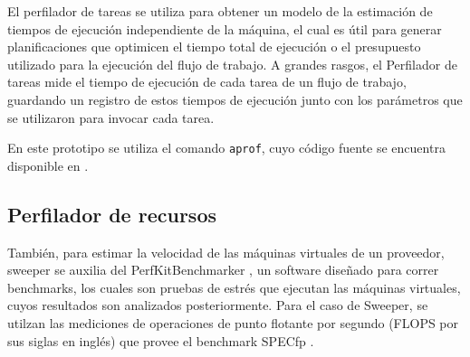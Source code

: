 El perfilador de tareas se utiliza para obtener un modelo de la estimación de tiempos de ejecución independiente de la máquina, el cual es útil para generar planificaciones que optimicen el tiempo total de ejecución o el presupuesto utilizado para la ejecución del flujo de trabajo. A grandes rasgos, el Perfilador de tareas mide el tiempo de ejecución de cada tarea de un flujo de trabajo, guardando un registro de estos tiempos de ejecución junto con los parámetros que se utilizaron para invocar cada tarea.

En este prototipo se utiliza el comando \texttt{aprof}, cuyo código fuente se encuentra disponible en \cite{ercoppa2017aprof}.




\subsection{Perfilador de recursos}

También, para estimar la velocidad de las máquinas virtuales de un proveedor, sweeper se auxilia del PerfKitBenchmarker \cite{google2017perfkitbenchmarker}, un software diseñado para correr benchmarks, los cuales son pruebas de estrés que ejecutan las máquinas virtuales, cuyos resultados son analizados posteriormente. Para el caso de Sweeper, se utilzan las mediciones de operaciones de punto flotante por segundo (FLOPS por sus siglas en inglés) que provee el benchmark SPECfp \cite{spec2016specfp}.
